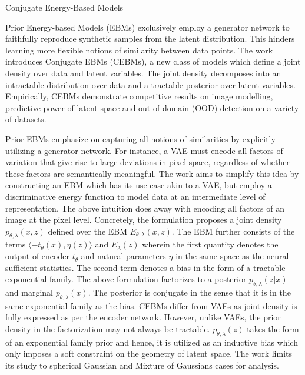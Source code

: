 \documentclass[12pt,letterpaper]{article}
\begin{document}
\begin{center}
  \large{Conjugate Energy-Based Models}
\end{center}

Prior Energy-based Models (EBMs) exclusively employ a generator network to faithfully reproduce synthetic samples from the latent distribution. This hinders learning more flexible notions of similarity between data points. The work introduces Conjugate EBMs (CEBMs), a new class of models which define a joint density over data and latent variables. The joint density decomposes into an intractable distribution over data and a tractable posterior over latent variables. Empirically, CEBMs demonstrate competitive results on image modelling, predictive power of latent space and out-of-domain (OOD) detection on a variety of datasets.

Prior EBMs emphasize on capturing all notions of similarities by explicitly utilizing a generator network. For instance, a VAE must encode all factors of variation that give rise to large deviations in pixel space, regardless of whether these factors are semantically meaningful. The work aims to simplify this idea by constructing an EBM which has its use case akin to a VAE, but employ a discriminative energy function to model data at an intermediate level of representation. The above intuition does away with encoding all factors of an image at the pixel level. Concretely, the formulation proposes a joint density $p_{\theta,\lambda}(x,z)$ defined over the EBM $E_{\theta,\lambda}(x,z)$. The EBM further consists of the terms $\langle-t_{\theta}(x),\eta(z)\rangle$ and $E_{\lambda}(z)$ wherein the first quantity denotes the output of encoder $t_{\theta}$ and natural parameters $\eta$ in the same space as the neural sufficient statistics. The second term denotes a bias in the form of a tractable exponential family. The above formulation factorizes to a posterior $p_{\theta,\lambda}(z|x)$ and marginal $p_{\theta,\lambda}(x)$. The posterior is conjugate in the sense that it is in the same exponential family as the bias. CEBMs differ from VAEs as joint density is fully expressed as per the encoder network. However, unlike VAEs, the prior density in the factorization may not always be tractable. $p_{\theta,\lambda}(z)$ takes the form of an exponential family prior and hence, it is utilized as an inductive bias which only imposes a soft constraint on the geometry of latent space. The work limits its study to spherical Gaussian and Mixture of Gaussians cases for analysis.
\end{document}

